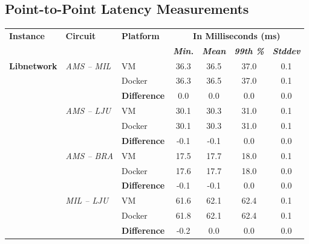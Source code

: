 \begin{appendices}
\newpage
\section{ Point-to-Point Latency Measurements} \label{app:PtP}

\setlength\LTleft{0pt}
\setlength\LTright{0pt}
\begin{longtable}{@{\extracolsep{\fill}}lllcccc@{}}
\toprule
\textbf{Instance} & \multicolumn{1}{l}{\textbf{Circuit}} & {\color[HTML]{333333} \textbf{Platform}} & \multicolumn{4}{c}{\textbf{In Milliseconds (ms)}} \\
\textbf{} & \textbf{} & {\color[HTML]{333333} \textbf{}} & \textit{\textbf{Min.}} & \textit{\textbf{Mean}} & \textit{\textbf{99th \%}} & \textit{\textbf{Stddev}} \\ \midrule
\textbf{Libnetwork} & \textit{AMS – MIL} & {\color[HTML]{333333} VM} & 36.3 & 36.5 & 37.0 & 0.1 \\
 &  & {\color[HTML]{333333} Docker} & 36.3 & 36.5 & 37.0 & 0.1 \\ \cmidrule(l){3-7} 
 &  & {\color[HTML]{333333} \textbf{Difference}} & 0.0 & 0.0 & 0.0 & 0.0 \\ \cmidrule(l){2-7} 
 & \textit{AMS – LJU} & {\color[HTML]{333333} VM} & 30.1 & 30.3 & 31.0 & 0.1 \\
 &  & {\color[HTML]{333333} Docker} & 30.1 & 30.3 & 31.0 & 0.1 \\ \cmidrule(l){3-7} 
 &  & {\color[HTML]{333333} \textbf{Difference}} & {\color[HTML]{CB0000} -0.1} & {\color[HTML]{CB0000} -0.1} & 0.0 & 0.0 \\ \cmidrule(l){2-7} 
 & \textit{AMS – BRA} & {\color[HTML]{333333} VM} & 17.5 & 17.7 & 18.0 & 0.1 \\
 &  & {\color[HTML]{333333} Docker} & 17.6 & 17.7 & 18.0 & 0.0 \\ \cmidrule(l){3-7} 
 &  & {\color[HTML]{333333} \textbf{Difference}} & {\color[HTML]{CB0000} -0.1} & {\color[HTML]{CB0000} -0.1} & 0.0 & 0.0 \\ \cmidrule(l){2-7} 
 & \textit{MIL – LJU} & {\color[HTML]{333333} VM} & 61.6 & 62.1 & 62.4 & 0.1 \\
 &  & {\color[HTML]{333333} Docker} & 61.8 & 62.1 & 62.4 & 0.1 \\ \cmidrule(l){3-7} 
 &  & {\color[HTML]{333333} \textbf{Difference}} & {\color[HTML]{CB0000} -0.2} & 0.0 & 0.0 & 0.0 \\ \cmidrule(l){2-7} 

\end{longtable}
\end{appendices}
